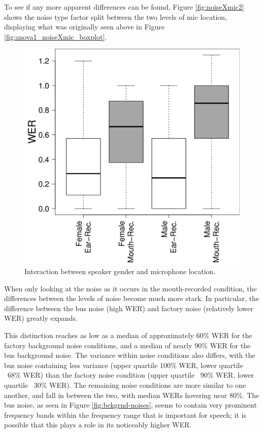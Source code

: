 \documentclass[dissertation,copyright]{uathesis}
\makeatletter
\def\maxwidth{ %
  \ifdim\Gin@nat@width>\linewidth
    \linewidth
  \else
    \Gin@nat@width
  \fi
}
\makeatother
\begin{document}
To see if any more apparent differences can be found, Figure \ref{fig:noiseXmic2} shows the noise type factor split between the two levels of mic location, displaying what was originally seen above in Figure \ref{fig:anova1_noiseXmic_boxplot}.  
%
\begin{figure}

\includegraphics[width=\maxwidth]{figure/spkr-gender_mic-location_interaction-1} 

\caption{Interaction between speaker gender and microphone location.}
\label{fig:spkr-genXmic-loc}
\end{figure}
%
When only looking at the noise as it occurs in the mouth-recorded condition, the differences between the levels of noise become much more stark.  In particular, the difference between the bus noise (high WER) and factory noise (relatively lower WER) greatly expands. 

This distinction reaches as low as a median of approximately 60\% WER for the factory background noise conditions, and a median of nearly 90\% WER for the bus background noise.  The variance within noise conditions also differs, with the bus noise containing less variance (upper quartile 100\% WER, lower quartile ~68\% WER) than the factory noise condition (upper quartile ~90\% WER, lower quartile ~30\% WER).  The remaining noise conditions are more similar to one another, and fall in between the two, with median WERs hovering near 80\%.  The bus noise, as seen in Figure \ref{fig:bckgrnd-noises}, seems to contain very prominent frequency bands within the frequency range that is important for speech; it is possible that this plays a role in its noticeably higher WER.
\end{document}
